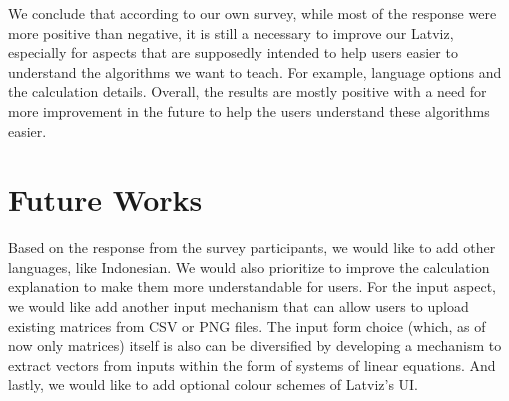 \documentclass[runningheads]{llncs}
\begin{document}
We conclude that according to our own survey, while most of the response were more positive than negative, it is still a necessary to improve our Latviz, especially for aspects that are supposedly intended to help users easier to understand the algorithms we want to teach. For example, language options and the calculation details. Overall, the results are mostly positive with a need for more improvement in the future to help the users understand these algorithms easier. 

\section{Future Works}
Based on the response from the survey participants, we would like to add other languages, like Indonesian. We would also prioritize to improve the calculation explanation to make them more understandable for users. For the input aspect, we would like add another input mechanism that can allow users to upload existing matrices from CSV or PNG files. The input form choice (which, as of now only matrices) itself is also can be diversified by developing a mechanism to extract vectors from inputs within the form of systems of linear equations. And lastly, we would like to add optional colour schemes of Latviz's UI.
\end{document}
